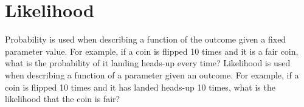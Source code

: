 \section{Likelihood}
 Probability is used when describing a function of the outcome given a fixed parameter value.
 For example, if a coin is flipped 10 times and it is a fair coin, what is the probability of it landing
 heads-up every time? Likelihood is used when describing a function of a parameter given an outcome.
 For example, if a coin is flipped 10 times and it has landed heads-up 10 times, what is the likelihood
 that the coin is fair?